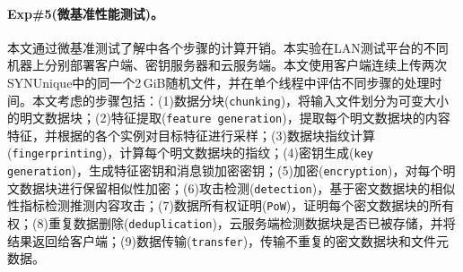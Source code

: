 \paragraph*{Exp\#5(微基准性能测试)。}
本文通过微基准测试了解\prototype 中各个步骤的计算开销。本实验在LAN测试平台的不同机器上分别部署客户端、密钥服务器和云服务端。本文使用客户端连续上传两次SYNUnique中的同一个2\,GiB随机文件，并在单个线程中评估不同步骤的处理时间。本文考虑的步骤包括：(1)数据分块({\tt chunking})，将输入文件划分为可变大小的明文数据块；(2)特征提取({\tt feature generation})，提取每个明文数据块的内容特征，并根据\sysnameF 的各个实例对目标特征进行采样；(3)数据块指纹计算({\tt fingerprinting})，计算每个明文数据块的指纹；(4)密钥生成({\tt key generation})，生成特征密钥和消息锁加密密钥；(5)加密({\tt encryption})，对每个明文数据块进行保留相似性加密；(6)攻击检测({\tt detection})，基于密文数据块的相似性指标检测推测内容攻击；(7)数据所有权证明({\tt PoW})，证明每个密文数据块的所有权；(8)重复数据删除({\tt deduplication})，云服务端检测数据块是否已被存储，并将结果返回给客户端；(9)数据传输({\tt transfer})，传输不重复的密文数据块和文件元数据。

